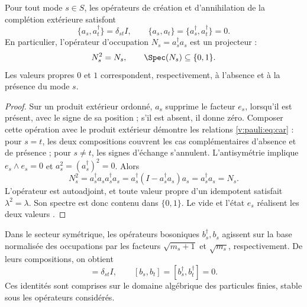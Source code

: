 \begin{theorem}
\label{v:rec:completaciones:statement:01}
\label{v:rec:thm:principio-exclusion-pauli}
Pour tout mode \(s\in S\), les opérateurs de création et d’annihilation de la
complétion extérieure satisfont
\begin{equation}
 \{a_s,a_t^\dagger\}=\delta_{st}I,
 \qquad
 \{a_s,a_t\}=\{a_s^\dagger,a_t^\dagger\}=0.
 \label{v:pauli:eq:car}
\end{equation}
En particulier, l’opérateur d’occupation
\(N_s=a_s^\dagger a_s\) est un projecteur :
\begin{equation}
 N_s^2=N_s,
 \qquad \Spec(N_s)\subseteq\{0,1\}.
 \label{v:pauli:eq:proyeccion-ocupacion}
\end{equation}
Les valeurs propres \(0\) et \(1\) correspondent, respectivement, à l’absence
et à la présence du mode \(s\).
\end{theorem}

\begin{proof}
Sur un produit extérieur ordonné, \(a_s\) supprime le facteur \(e_s\), lorsqu’il est
présent, avec le signe de sa position ; s’il est absent, il donne zéro. Composer
cette opération avec le produit extérieur démontre les relations
\eqref{v:pauli:eq:car} : pour \(s=t\), les deux compositions couvrent les cas
complémentaires d’absence et de présence ; pour \(s\ne t\), les signes
d’échange s’annulent. L’antisymétrie implique
\(e_s\wedge e_s=0\) et
\(a_s^2=(a_s^\dagger)^2=0\). Alors
\begin{equation}
 N_s^2=a_s^\dagger a_s a_s^\dagger a_s
 =a_s^\dagger(I-a_s^\dagger a_s)a_s
 =a_s^\dagger a_s=N_s.
 \label{v:pauli:eq:prueba-idempotencia}
\end{equation}
L’opérateur est autoadjoint, et toute valeur propre d’un idempotent satisfait
\(\lambda^2=\lambda\). Son spectre est donc contenu dans
\(\{0,1\}\). Le vide et l’état \(e_s\) réalisent les deux valeurs
\cite{Pauli1925,Dirac1926}.
\end{proof}

Dans le secteur symétrique, les opérateurs bosoniques \(b_s^\dagger,b_s\)
agissent sur la base normalisée des occupations par les facteurs
\(\sqrt{m_s+1}\) et \(\sqrt{m_s}\), respectivement. De leurs compositions,
on obtient
\begin{equation}
 [b_s,b_t^\dagger]=\delta_{st}I,
 \qquad [b_s,b_t]=[b_s^\dagger,b_t^\dagger]=0.
 \label{v:pauli:eq:ccr}
\end{equation}
Ces identités sont comprises sur le domaine algébrique des particules
finies, stable sous les opérateurs considérés.

